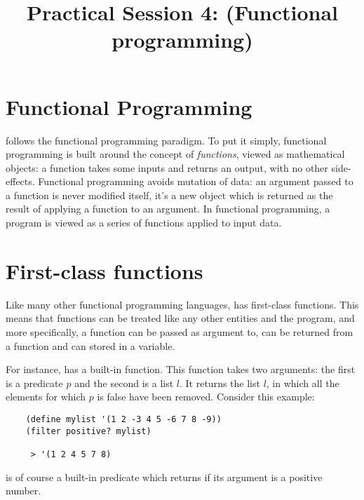 \documentclass{../../../tp}
\title{Practical Session 4: \scheme (Functional programming)}
\author{}
\begin{document}
	
	\maketitle



\section{Functional Programming}

\scheme follows the functional programming paradigm. To put it simply, functional programming is built around the concept of \emph{functions}, viewed as mathematical objects: a function takes some inputs and returns an output, with no other side-effects. Functional programming avoids mutation of data: an argument passed to a function is never modified itself, it's a new object which is returned as the result of applying a function to an argument. In functional programming, a program is viewed as a series of functions applied to input data.

\section{First-class functions}

Like many other functional programming languages, \scheme has first-class functions. This means that functions can be treated like any other entities and the program, and more specifically, a function can be passed as argument to, can be returned from a function and can stored in a variable.

For instance, \scheme has a built-in  function. This function takes two arguments: the first is a predicate $p$ and the second is a list $l$. It returns the list $l$, in which all the elements for which $p$ is false have been removed. Consider this example:

\begin{verbatim}
	(define mylist '(1 2 -3 4 5 -6 7 8 -9))
	(filter positive? mylist)
	 
	 > '(1 2 4 5 7 8)
\end{verbatim}

 is of course a built-in \scheme predicate which returns  if its argument is a positive number. 
\end{document}
